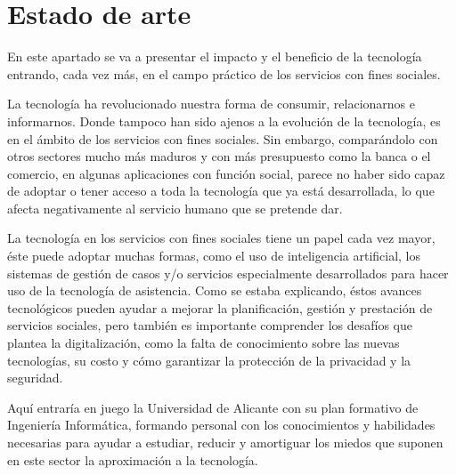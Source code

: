 
\chapter{Estado de arte}
En este apartado se va a presentar el impacto y el beneficio de la tecnología entrando, cada vez más, en el campo práctico de los servicios con fines sociales.

\par La tecnología ha revolucionado nuestra forma de consumir, relacionarnos e informarnos. Donde tampoco han sido ajenos a la evolución de la tecnología, es en el ámbito de los servicios con fines sociales. Sin embargo, comparándolo con otros sectores mucho más maduros y con más presupuesto como la banca o el comercio, en algunas aplicaciones con función social, parece no haber sido capaz de adoptar o tener acceso a toda la tecnología que ya está desarrollada, lo que afecta negativamente al servicio humano que se pretende dar.
\par La tecnología en los servicios con fines sociales tiene un papel cada vez mayor, éste puede adoptar muchas formas, como el uso de inteligencia artificial, los sistemas de gestión de casos y/o servicios especialmente desarrollados para hacer uso de la tecnología de asistencia. Como se estaba explicando, éstos avances tecnológicos pueden ayudar a mejorar la planificación, gestión y prestación de servicios sociales, pero también es importante comprender los desafíos que plantea la digitalización, como la falta de conocimiento sobre las nuevas tecnologías, su costo y cómo garantizar la protección de la privacidad y la seguridad.
\par Aquí entraría en juego la Universidad de Alicante con su plan formativo de Ingeniería Informática, formando personal con los conocimientos y habilidades necesarias para ayudar a estudiar, reducir y amortiguar los miedos que suponen en este sector la aproximación a la tecnología.
\clearpage
